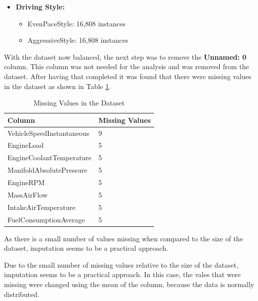 \documentclass[10pt,journal,compsoc]{IEEEtran}
\begin{document}
\begin{itemize}
    \item \textbf{Driving Style:}
    \begin{itemize}
        \item EvenPaceStyle: 16,808 instances
        \item AggressiveStyle: 16,808 instances
    \end{itemize}
\end{itemize}

With the dataset now balanced, the next step was to remove the \textbf{Unnamed: 0} column. This column was not needed for the analysis and was removed from the dataset.
After having that completed it was found that there were missing values in the dataset as shown in Table \ref{table:data_missing_values}.

\begin{table}[h]
    \centering    
    \begin{tabular}{|l|l|}
    \hline
    \textbf{Column}                   & \textbf{Missing Values} \\ \hline
    VehicleSpeedInstantaneous         & 9                       \\ \hline
    EngineLoad                        & 5                       \\ \hline
    EngineCoolantTemperature          & 5                       \\ \hline
    ManifoldAbsolutePressure          & 5                       \\ \hline
    EngineRPM                         & 5                       \\ \hline
    MassAirFlow                       & 5                       \\ \hline
    IntakeAirTemperature              & 5                       \\ \hline
    FuelConsumptionAverage            & 5                       \\ \hline
    \end{tabular}
    \caption{Missing Values in the Dataset}
    \label{table:data_missing_values}
\end{table}

As there is a small number of values missing when compared to the size of the dataset, imputation seems to be a practical approach. 

Due to the small number of missing values relative to the size of the dataset, imputation seems to be a practical approach. In this case, the vales that were missing were
changed using the mean of the column, because the data is normally distributed.
\end{document}
